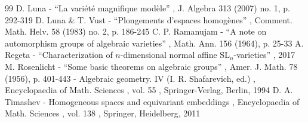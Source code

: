 \documentclass[11pt]{article}
\numberwithin{equation}{section}
\begin{document}
\begin{thebibliography}{99}
 D. Luna - “La variété magnifique modèle” , J. Algebra 313 (2007) no. 1, p. 292-319
 D. Luna \& T. Vust - “Plongements d’espaces homogènes” , Comment. Math. Helv. 58 (1983) no. 2, p. 186-245
 C. P. Ramanujam - “A note on automorphism groups of algebraic varieties” , Math. Ann. 156 (1964), p. 25-33
 A. Regeta - “Characterization of $n$-dimensional normal affine $\mathrm{SL}_n$-varieties” , 2017
 M. Rosenlicht - “Some basic theorems on algebraic groups” , Amer. J. Math. 78 (1956), p. 401-443
 - Algebraic geometry. IV (I. R. Shafarevich, ed.) , Encyclopaedia of Math. Sciences , vol. 55 , Springer-Verlag, Berlin, 1994
 D. A. Timashev - Homogeneous spaces and equivariant embeddings , Encyclopaedia of Math. Sciences , vol. 138 , Springer, Heidelberg, 2011
\end{thebibliography}
\end{document}
